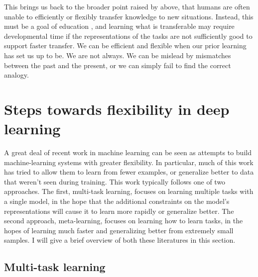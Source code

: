 This brings us back to the broader point raised by \citet{Detterman1993} above, that humans are often unable to efficiently or flexibly transfer knowledge to new situations. Instead, this must be a goal of education \citep{Bransford1999}, and learning what is transferable may require developmental time \citep{Lampinen2017a} if the representations of the tasks are not sufficiently good to support faster transfer. We can be efficient and flexible when our prior learning has set us up to be. We are not always. We can be mislead by mismatches between the past and the present, or we can simply fail to find the correct analogy.\par

\section{Steps towards flexibility in deep learning}

A great deal of recent work in machine learning can be seen as attempts to build machine-learning systems with greater flexibility. In particular, much of this work has tried to allow them to learn from fewer examples, or generalize better to data that weren't seen during training. This work typically follows one of two approaches. The first, multi-task learning, focuses on learning multiple tasks with a single model, in the hope that the additional constraints on the model's representations will cause it to learn more rapidly or generalize better. The second approach, meta-learning, focuses on learning how to learn tasks, in the hopes of learning much faster and generalizing better from extremely small samples. I will give a brief overview of both these literatures in this section. \par

\subsection{Multi-task learning}

